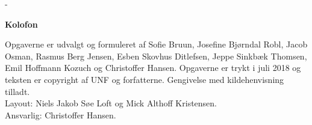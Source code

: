 \newpage


\begin{adjustwidth*}{\frontpagecorrection}{-\frontpagecorrection}
  \thispagestyle{empty}
  \strut
  \setlength{\parindent}{0pt}
  \addtolength{\parskip}{.6em}

  \vfill
    
  \begin{center}
    \bfseries Kolofon
  \end{center}
 
  \makeatletter
  \edef\fontandleading{\@memptsize.0/\the\baselineskip}
  \makeatother

  \small
   
  \textsl{\thesistitle}
    
  \smallskip
  
  Opgaverne er udvalgt og formuleret af Sofie Bruun, Josefine Bjørndal Robl, Jacob Osman, Rasmus Berg Jensen, Esben Skovhus Ditlefsen, Jeppe Sinkbæk Thomsen, Emil Hoffmann Kozuch og Christoffer Hansen. Opgaverne er trykt i juli 2018 og teksten
  er copyright
   af UNF og forfatterne. Gengivelse med kildehenvisning tilladt. \\
  Layout: Niels Jakob Søe Loft og Mick Althoff Kristensen.\\
  Ansvarlig: Christoffer Hansen.
\end{adjustwidth*}



